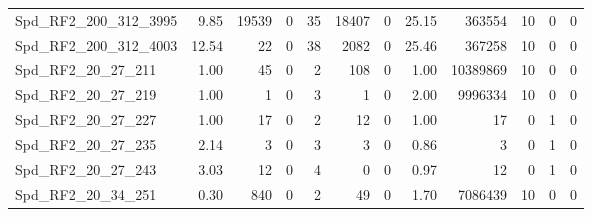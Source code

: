 \begin{longtable}[c]{@{}lrrrrrrrrrrr@{}}
Spd\_RF2\_200\_312\_3995      & 9.85                   & 19539                   & 0                       & 35                     & 18407                   & 0                       & 25.15                   & 363554                   & 10                       & 0                        & 0                        \\
Spd\_RF2\_200\_312\_4003      & 12.54                  & 22                      & 0                       & 38                     & 2082                    & 0                       & 25.46                   & 367258                   & 10                       & 0                        & 0                        \\
Spd\_RF2\_20\_27\_211         & 1.00                   & 45                      & 0                       & 2                      & 108                     & 0                       & 1.00                    & 10389869                 & 10                       & 0                        & 0                        \\
Spd\_RF2\_20\_27\_219         & 1.00                   & 1                       & 0                       & 3                      & 1                       & 0                       & 2.00                    & 9996334                  & 10                       & 0                        & 0                        \\
Spd\_RF2\_20\_27\_227         & 1.00                   & 17                      & 0                       & 2                      & 12                      & 0                       & 1.00                    & 17                       & 0                        & 1                        & 0                        \\
Spd\_RF2\_20\_27\_235         & 2.14                   & 3                       & 0                       & 3                      & 3                       & 0                       & 0.86                    & 3                        & 0                        & 1                        & 0                        \\
Spd\_RF2\_20\_27\_243         & 3.03                   & 12                      & 0                       & 4                      & 0                       & 0                       & 0.97                    & 12                       & 0                        & 1                        & 0                        \\
Spd\_RF2\_20\_34\_251         & 0.30                   & 840                     & 0                       & 2                      & 49                      & 0                       & 1.70                    & 7086439                  & 10                       & 0                        & 0                        \\

\end{longtable}
